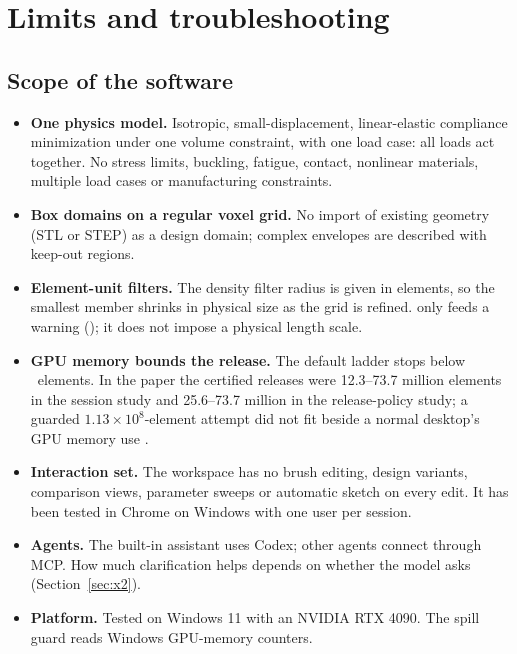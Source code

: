 \chapter{Limits and troubleshooting}\label{ch:limits}

\section{Scope of the software}\label{sec:scope}
\begin{itemize}
  \item \textbf{One physics model.} Isotropic, small-displacement, linear-elastic compliance minimization under one
  volume constraint, with one load case: all loads act together. No stress limits, buckling, fatigue, contact,
  nonlinear materials, multiple load cases or manufacturing constraints.
  \item \textbf{Box domains on a regular voxel grid.} No import of existing geometry (STL or STEP) as a design domain;
  complex envelopes are described with keep-out regions.
  \item \textbf{Element-unit filters.} The density filter radius is given in elements, so the smallest member shrinks in
  physical size as the grid is refined.  only feeds a warning (); it does not impose a
  physical length scale.
  \item \textbf{GPU memory bounds the release.} The default ladder stops below \LadderMax\ elements. In the paper the
  certified releases were 12.3--73.7 million elements in the session study and 25.6--73.7 million in the release-policy
  study; a guarded $1.13\times10^{8}$-element attempt did not fit beside a normal desktop's GPU memory use .
  \item \textbf{Interaction set.} The workspace has no brush editing, design variants, comparison views, parameter sweeps
  or automatic sketch on every edit. It has been tested in Chrome on Windows with one user per session.
  \item \textbf{Agents.} The built-in assistant uses Codex; other agents connect through MCP. How much clarification
  helps depends on whether the model asks (Section~\ref{sec:x2}).
  \item \textbf{Platform.} Tested on Windows 11 with an NVIDIA RTX 4090. The spill guard reads Windows GPU-memory
  counters.
\end{itemize}

